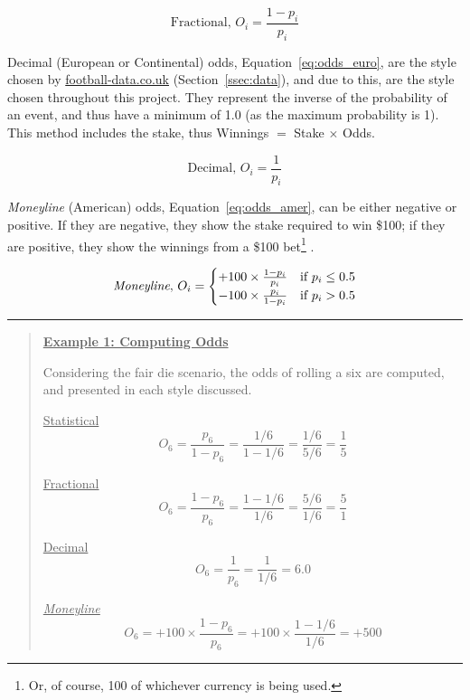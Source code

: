 \documentclass[a4paper,10pt]{report}
\begin{document}
\begin{equation}
\textrm{Fractional, }O_i = \frac{1-p_i}{p_i} \label{eq:odds_british}
\end{equation}

Decimal (European or Continental) odds, Equation~\ref{eq:odds_euro}, are the style chosen by \url{football-data.co.uk} (Section~\ref{ssec:data}), and due to this, are the style chosen throughout this project. They represent the inverse of the probability of an event, and thus have a minimum of 1.0 (as the maximum probability is 1). This method includes the stake, thus Winnings $=$ Stake $\times$ Odds. 

\begin{equation}
\textrm{Decimal, }O_i = \frac{1}{p_i} \label{eq:odds_euro}
\end{equation}

\textit{Moneyline} (American) odds, Equation~\ref{eq:odds_amer}, can be either negative or positive. If they are negative, they show the stake required to win \$100; if they are positive, they show the winnings from a \$100 bet\footnote{Or, of course, 100 of whichever currency is being used.} \autocite{AmericanOdds19}. 

\begin{equation} \label{eq:odds_amer}
\textrm{\textit{Moneyline}, }O_i = 
\begin{cases}
+100\times\frac{1-p_i}{p_i} & \textrm{if }p_i \le 0.5 \\
-100\times\frac{p_i}{1-p_i} & \textrm{if }p_i > 0.5
\end{cases}
\end{equation}

\begin{center}\rule{0.75\textwidth}{0.6pt}\end{center}

\begin{quote}
	\begin{center}\textbf{\underline{Example 1: Computing Odds}}\end{center}
	Considering the fair die scenario, the odds of rolling a six are computed, and presented in each style discussed.
	\begin{center}
	\underline{Statistical}
	$$O_6 = \frac{p_6}{1-p_6} = \frac{1/6}{1 - 1/6} = \frac{1/6}{5/6} = \frac{1}{5}$$
	
	\underline{Fractional}
	$$O_6 = \frac{1 - p_6}{p_6} = \frac{1 - 1/6}{1/6} = \frac{5/6}{1/6} = \frac{5}{1}$$
	
	\underline{Decimal}
	$$O_6 = \frac{1}{p_6} = \frac{1}{1/6} = 6.0$$
	
	\underline{\textit{Moneyline}}
	$$O_6 = +100\times\frac{1 - p_6}{p_6} = +100\times\frac{1 - 1/6}{1/6} = +500$$
	\end{center}
\end{quote}
\end{document}

